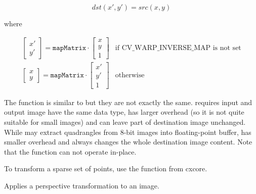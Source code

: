 \[
dst(x',y') = src(x,y)
\]

where

\[
\begin{matrix}
\begin{bmatrix}
x'\\
y'
\end{bmatrix} = \texttt{mapMatrix} \cdot \begin{bmatrix}
x\\
y\\
1
\end{bmatrix} & \mbox{if CV\_WARP\_INVERSE\_MAP is not set}\\
\begin{bmatrix}
x\\
y
\end{bmatrix} = \texttt{mapMatrix} \cdot \begin{bmatrix}
x'\\
y'\\
1
\end{bmatrix}& \mbox{otherwise}
\end{matrix}
\]

The function is similar to  but they are not exactly the same.  requires input and output image have the same data type, has larger overhead (so it is not quite suitable for small images) and can leave part of destination image unchanged. While  may extract quadrangles from 8-bit images into floating-point buffer, has smaller overhead and always changes the whole destination image content.
Note that the function can not operate in-place.

To transform a sparse set of points, use the  function from cxcore.

Applies a perspective transformation to an image.


